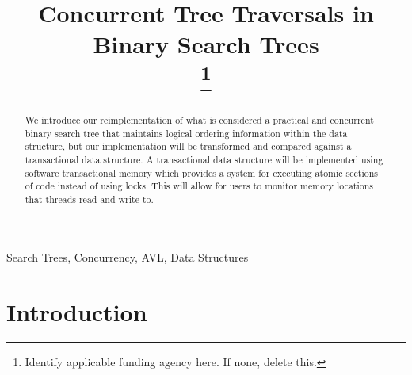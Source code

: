 \documentclass[conference]{IEEEtran}
\begin{document}
\title{Concurrent Tree Traversals in Binary Search Trees\\
\thanks{Identify applicable funding agency here. If none, delete this.}
}

\author{
\and
{}
}

\maketitle

\begin{abstract}
We introduce our reimplementation of what is considered a practical and concurrent binary search tree that maintains logical ordering information within the data structure, but our implementation will be transformed and compared against a transactional data structure. A transactional data structure will be implemented using software transactional memory which provides a system for executing atomic sections of code instead of using locks. This will allow for users to monitor memory locations that threads read and write to.
\end{abstract}

\begin{IEEEkeywords}
Search Trees, Concurrency, AVL, Data Structures
\end{IEEEkeywords}

\section{Introduction}
\end{document}
